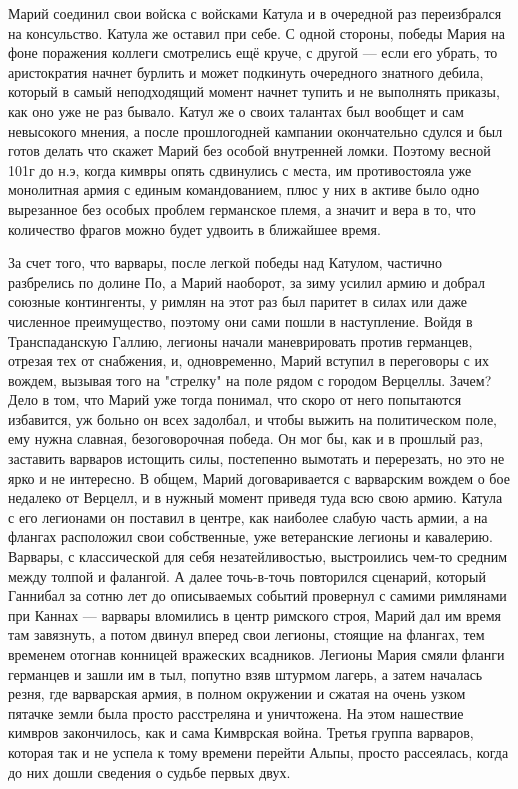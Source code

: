 Марий соединил свои войска с войсками Катула и в очередной раз переизбрался на консульство. Катула же оставил при себе. С одной стороны, победы Мария на фоне поражения коллеги смотрелись ещё круче, с другой — если его убрать, то аристократия начнет бурлить и может подкинуть очередного знатного дебила, который в самый неподходящий момент начнет тупить и не выполнять приказы, как оно уже не раз бывало. Катул же о своих талантах был вообщет и сам невысокого мнения, а после прошлогодней кампании окончательно сдулся и был готов делать что скажет Марий без особой внутренней ломки. Поэтому весной 101г до н.э, когда кимвры опять сдвинулись с места, им противостояла уже монолитная армия с единым командованием, плюс у них в активе было одно вырезанное без особых проблем германское племя, а значит и вера в то, что количество фрагов можно будет удвоить в ближайшее время.


За счет того, что варвары, после легкой победы над Катулом, частично разбрелись по долине По, а Марий наоборот, за зиму усилил армию и добрал союзные контингенты, у римлян на этот раз был паритет в силах или даже численное преимущество, поэтому они сами пошли в наступление. Войдя в Транспаданскую Галлию, легионы начали маневрировать против германцев, отрезая тех от снабжения, и, одновременно, Марий вступил в переговоры с их вождем, вызывая того на "стрелку" на поле рядом с городом Верцеллы. Зачем? Дело в том, что Марий уже тогда понимал, что скоро от него попытаются избавится, уж больно он всех задолбал, и чтобы выжить на политическом поле, ему нужна славная, безоговорочная победа. Он мог бы, как и в прошлый раз, заставить варваров истощить силы, постепенно вымотать и перерезать, но это не ярко и не интересно. В общем, Марий договаривается с варварским вождем о бое недалеко от Верцелл, и в нужный момент приведя туда всю свою армию. Катула с его легионами он поставил в центре, как наиболее слабую часть армии, а на флангах расположил свои собственные, уже ветеранские легионы и кавалерию. Варвары, с классической для себя незатейливостью, выстроились чем-то средним между толпой и фалангой. А далее точь-в-точь повторился сценарий, который Ганнибал за сотню лет до описываемых событий провернул с самими римлянами при Каннах — варвары вломились в центр римского строя, Марий дал им время там завязнуть, а потом двинул вперед свои легионы, стоящие на флангах, тем временем отогнав конницей вражеских всадников. Легионы Мария смяли фланги германцев и зашли им в тыл, попутно взяв штурмом лагерь, а затем началась резня, где варварская армия, в полном окружении и сжатая на очень узком пятачке земли была просто расстреляна и уничтожена. На этом нашествие кимвров закончилось, как и сама Кимврская война. Третья группа варваров, которая так и не успела к тому времени перейти Альпы, просто рассеялась, когда до них дошли сведения о судьбе первых двух.


